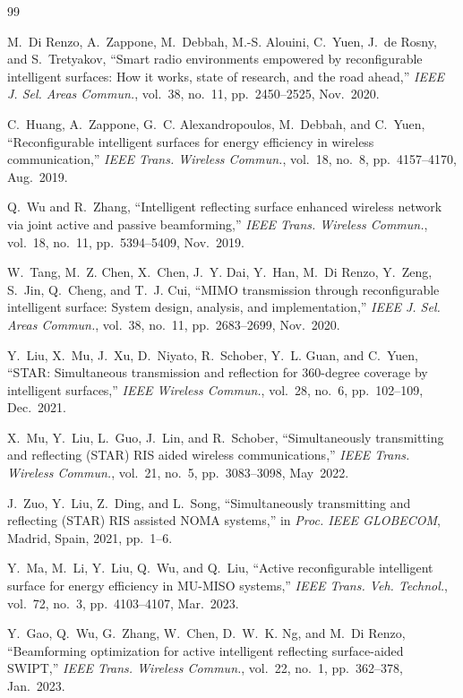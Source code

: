\documentclass[journal]{IEEEtran}
\begin{document}
\begin{thebibliography}{99}

M.~Di Renzo, A.~Zappone, M.~Debbah, M.-S. Alouini, C.~Yuen, J.~de Rosny, and S.~Tretyakov,
``Smart radio environments empowered by reconfigurable intelligent surfaces: How it works, state of research, and the road ahead,''
\emph{IEEE J. Sel. Areas Commun.}, vol.~38, no.~11, pp.~2450--2525, Nov.~2020.

C.~Huang, A.~Zappone, G.~C. Alexandropoulos, M.~Debbah, and C.~Yuen,
``Reconfigurable intelligent surfaces for energy efficiency in wireless communication,''
\emph{IEEE Trans. Wireless Commun.}, vol.~18, no.~8, pp.~4157--4170, Aug.~2019.

Q.~Wu and R.~Zhang,
``Intelligent reflecting surface enhanced wireless network via joint active and passive beamforming,''
\emph{IEEE Trans. Wireless Commun.}, vol.~18, no.~11, pp.~5394--5409, Nov.~2019.

W.~Tang, M.~Z. Chen, X.~Chen, J.~Y. Dai, Y.~Han, M.~Di Renzo, Y.~Zeng, S.~Jin, Q.~Cheng, and T.~J. Cui,
``MIMO transmission through reconfigurable intelligent surface: System design, analysis, and implementation,''
\emph{IEEE J. Sel. Areas Commun.}, vol.~38, no.~11, pp.~2683--2699, Nov.~2020.

Y.~Liu, X.~Mu, J.~Xu, D.~Niyato, R.~Schober, Y.~L. Guan, and C.~Yuen,
``STAR: Simultaneous transmission and reflection for 360-degree coverage by intelligent surfaces,''
\emph{IEEE Wireless Commun.}, vol.~28, no.~6, pp.~102--109, Dec.~2021.

X.~Mu, Y.~Liu, L.~Guo, J.~Lin, and R.~Schober,
``Simultaneously transmitting and reflecting (STAR) RIS aided wireless communications,''
\emph{IEEE Trans. Wireless Commun.}, vol.~21, no.~5, pp.~3083--3098, May~2022.

J.~Zuo, Y.~Liu, Z.~Ding, and L.~Song,
``Simultaneously transmitting and reflecting (STAR) RIS assisted NOMA systems,''
in \emph{Proc. IEEE GLOBECOM}, Madrid, Spain, 2021, pp.~1--6.

Y.~Ma, M.~Li, Y.~Liu, Q.~Wu, and Q.~Liu,
``Active reconfigurable intelligent surface for energy efficiency in MU-MISO systems,''
\emph{IEEE Trans. Veh. Technol.}, vol.~72, no.~3, pp.~4103--4107, Mar.~2023.

Y.~Gao, Q.~Wu, G.~Zhang, W.~Chen, D.~W.~K. Ng, and M.~Di Renzo,
``Beamforming optimization for active intelligent reflecting surface-aided SWIPT,''
\emph{IEEE Trans. Wireless Commun.}, vol.~22, no.~1, pp.~362--378, Jan.~2023.


\end{thebibliography}
\end{document}
